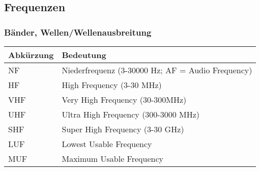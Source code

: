 \subsection*{Frequenzen}
\begin{frame}
  \frametitle{Bänder, Wellen/Wellenausbreitung}

  \begin{center}
    \footnotesize
    \begin{tabular}{|l|l|}\hline
      \textbf{Abkürzung} & \textbf{Bedeutung}                         \\ \hline \hline
      NF    & Niederfrequenz (3-30000 Hz; AF = Audio Frequency)       \\ \hline
      HF    & High Frequency (3-30 MHz)                               \\ \hline
      VHF   & Very High Frequency (30-300MHz)                         \\ \hline
      UHF   & Ultra High Frequency (300-3000 MHz)                     \\ \hline
      SHF   & Super High Frequency (3-30 GHz)                         \\ \hline
      LUF   & Lowest Usable Frequency                                 \\ \hline
      MUF   & Maximum Usable Frequency                                \\ \hline
    \end{tabular}
  \end{center}

\end{frame}



